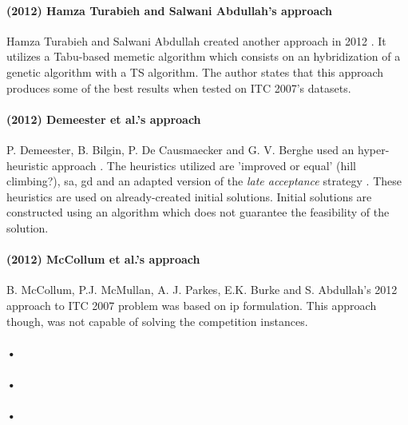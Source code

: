 \paragraph{(2012) Hamza Turabieh and Salwani Abdullah's approach}
Hamza Turabieh and Salwani Abdullah created another approach in 2012 \cite{Abdullah2012}. It utilizes a Tabu-based memetic algorithm which consists on an hybridization of a genetic algorithm with a TS algorithm. The author states that this approach produces some of the best results when tested on ITC 2007's datasets.

\paragraph{(2012) Demeester et al.'s approach}
P. Demeester, B. Bilgin, P. De Causmaecker and G. V. Berghe used an hyper-heuristic approach \cite{Demeester2012}. The heuristics utilized are 'improved or equal' {\color{red} (hill climbing?)}, \gls{sa}, \gls{gd} and an adapted version of the \textit{late acceptance} strategy \cite{Burke2008}. These heuristics are used on already-created initial solutions. Initial solutions are constructed using an algorithm which does not guarantee the feasibility of the solution.

\paragraph{(2012) McCollum et al.'s approach}
B. McCollum, P.J. McMullan, A. J. Parkes, E.K. Burke and S. Abdullah's 2012 approach \cite{McCollum2012} to ITC 2007 problem was based on \gls{ip} formulation. This approach though, was not capable of solving the competition instances.

\paragraph{•}

\paragraph{•}

\paragraph{•}
